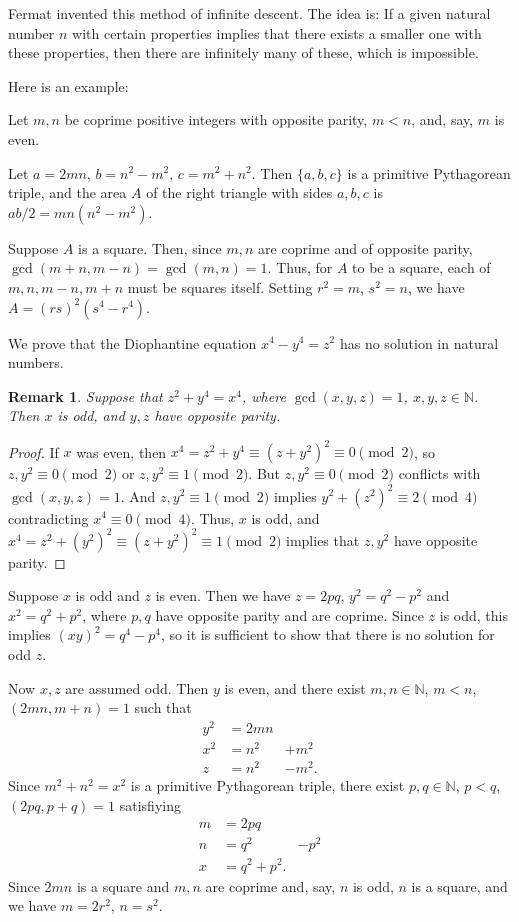 \documentclass[12pt]{article}
\newcommand{\N}{{\mathbb N}}
\newtheorem{rmk}{Remark}
\begin{document}
Fermat invented this method of infinite descent. The idea is: If a given natural number $n$
with certain properties implies that there exists a smaller one with these properties, then
there are infinitely many of these, which is impossible.

Here is an example:

Let $m,n$ be coprime positive integers with opposite parity, $m<n$, and, say, $m$ is even.

Let $a=2mn$, $b=n^2 -m^2$, $c=m^2 +n^2$. Then $\{a,b,c\}$ is a primitive Pythagorean triple,
and the area $A$ of the right triangle with sides $a, b, c$ is $ab/2=mn(n^2-m^2)$.

Suppose $A$ is a square. Then, since $m,n$ are coprime and of opposite parity,
$\gcd(m+n, m-n)=\gcd(m,n)=1$. Thus, for $A$ to be a square, each of $m,n,m-n,m+n$ must be
squares itself. Setting $r^2 =m$, $s^2 =n$, we have $A=(rs)^2(s^4-r^4)$.

We prove that the Diophantine equation $x^4-y^4=z^2$ has no solution in natural numbers.
\begin{rmk}
Suppose that $z^2+y^4=x^4$, where $\gcd(x,y,z)=1$, $x,y,z \in \N$. Then $x$ is odd, and
$y,z$ have opposite parity.
\end{rmk}
\begin{proof}
If $x$ was even, then $x^4=z^2+y^4 \equiv (z+y^2)^2 \equiv 0 \pmod{2}$, so $z, y^2 \equiv 0
\pmod{2}$ or $z, y^2 \equiv 1 \pmod{2}$. But $z, y^2 \equiv 0 \pmod{2}$ conflicts with
$\gcd(x,y,z)=1$. And $z,y^2 \equiv 1 \pmod 2$ implies $y^2+(z^2)^2\equiv 2 \pmod{4}$
contradicting $x^4 \equiv 0 \pmod{4}$. Thus, $x$ is odd, and $x^4=z^2+(y^2)^2 \equiv (z+y^2)^2 \equiv 1 \pmod{2}$ implies that $z,y^2$ have opposite parity.
\end{proof}
Suppose $x$ is odd and $z$ is even. Then we have $z=2pq$, $y^2 =q^2-p^2$ and $x^2 =q^2 +p^2$, where $p,q$ have opposite parity and are coprime. Since $z$ is odd, this implies $(xy)^2=q^4 -p^4$, so it is sufficient to show that there is no solution for odd $z$. 

Now $x,z$ are assumed odd. Then $y$ is even, and there exist $m,n \in \N$,
$m<n$,$(2mn,m+n)=1$ such that
\begin{eqnarray}
\label{eq1}
y^2&=2mn \\
x^2&=n^2&+m^2 \\
z&=n^2&-m^2.
\end{eqnarray}
Since $m^2+n^2=x^2$ is a primitive Pythagorean triple, there exist $p,q \in \N$, $p<q$,
$(2pq,p+q)=1$ satisfiying
\begin{eqnarray}
\label{eq2}
m&=2pq \\
n&=q^2&-p^2 \\
x&=q^2+p^2.
\end{eqnarray}
Since $2mn$ is a square and $m,n$ are coprime and, say, $n$ is odd, $n$ is a square, and we have $m=2r^2$, $n=s^2$.
\end{document}
